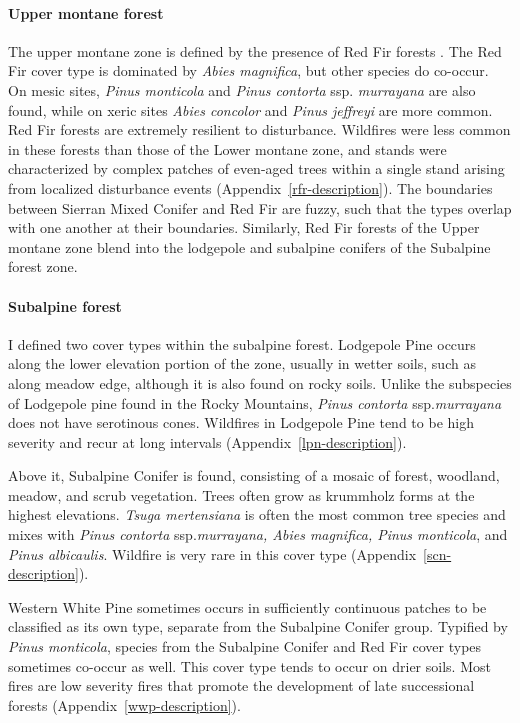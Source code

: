 \paragraph{Upper montane forest} The upper montane zone is defined by the presence of Red Fir forests \citep{Potter1998}. The Red Fir cover type is dominated by \emph{Abies magnifica}, but other species do co-occur. On mesic sites, \emph{Pinus monticola} and \emph{Pinus contorta} ssp. \emph{murrayana} are also found, while on xeric sites \emph{Abies concolor} and \emph{Pinus jeffreyi} are more common. Red Fir forests are extremely resilient to disturbance. Wildfires were less common in these forests than those of the Lower montane zone, and stands were characterized by complex patches of even-aged trees within a single stand arising from localized disturbance events (Appendix~\ref{rfr-description}). The boundaries between Sierran Mixed Conifer and Red Fir are fuzzy, such that the types overlap with one another at their boundaries. Similarly, Red Fir forests of the Upper montane zone blend into the lodgepole and subalpine conifers of the Subalpine forest zone.


\paragraph{Subalpine forest} I defined two cover types within the subalpine forest. Lodgepole Pine occurs along the lower elevation portion of the zone, usually in wetter soils, such as along meadow edge, although it is also found on rocky soils. Unlike the subspecies of Lodgepole pine found in the Rocky Mountains, \emph{Pinus contorta} ssp.\@ \emph{murrayana} does not have serotinous cones. Wildfires in Lodgepole Pine tend to be high severity and recur at long intervals (Appendix~\ref{lpn-description}).%

Above it, Subalpine Conifer is found, consisting of a mosaic of forest, woodland, meadow, and scrub vegetation. Trees often grow as krummholz forms at the highest elevations. \emph{Tsuga mertensiana} is often the most common tree species and mixes with \emph{Pinus contorta} ssp.\@ \emph{murrayana, Abies magnifica, Pinus monticola}, and \emph{Pinus albicaulis}. Wildfire is very rare in this cover type (Appendix~\ref{scn-description}). 

Western White Pine sometimes occurs in sufficiently continuous patches to be classified as its own type, separate from the Subalpine Conifer group. Typified by \emph{Pinus monticola}, species from the Subalpine Conifer and Red Fir cover types sometimes co-occur as well. This cover type tends to occur on drier soils. Most fires are low severity fires that promote the development of late successional forests (Appendix~\ref{wwp-description}).


